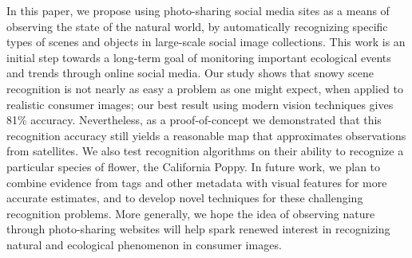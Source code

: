 \documentclass[10pt,journal,compsoc]{IEEEtran}
\begin{document}
In this paper, we propose using photo-sharing social media sites as a
means of observing the state of the natural world, by automatically
recognizing specific types of scenes and objects in large-scale social
image collections. This work is an initial step towards a long-term
goal of monitoring important ecological events and trends through
online social media.  Our study shows that snowy scene recognition is
not nearly as easy a problem as one might expect, when applied to realistic
consumer images; our best result using
modern vision techniques gives 81\% accuracy. Nevertheless, as a proof-of-concept
we demonstrated that this recognition accuracy still yields a reasonable
map that approximates observations from satellites.
We also test recognition algorithms on their ability to recognize a
particular species of flower, the California Poppy. In future work, we
plan to combine evidence from tags and other metadata with visual
features for more accurate estimates, and to develop novel techniques
for these challenging recognition problems. More generally, we hope
the idea of observing nature through photo-sharing websites will help
spark renewed interest in recognizing natural and ecological phenomenon in
consumer images.
\end{document}
